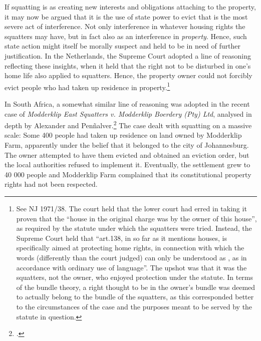 If squatting is  as creating new interests and obligations attaching to the property, it may now be argued that  it is the use of state power to evict that is the most severe act of interference. Not only interference in whatever housing rights the squatters may have, but in fact also as an interference in {\it property}. Hence, such state action might itself be morally suspect and held to be in need of further justification. In the Netherlands, the Supreme Court adopted a line of reasoning reflecting these insights, when it held that the right not to be disturbed in one's home life also applied to squatters. Hence, the property owner could not forcibly evict people who had taken up residence in  property.\footnote{See NJ 1971/38. The court held that the lower court had erred in taking it proven that the ``house in the original charge was  by the owner of this house'', as required by the statute under which the squatters were tried. Instead, the Supreme Court held that ``art.138, in so far as it mentions houses, is specifically aimed at protecting home rights, in connection with which the words  (differently than the court judged) can only be understood as  , as in accordance with ordinary use of language''. The upshot was that it was the squatters, not the owner, who enjoyed protection under the statute. In terms of the bundle theory, a right thought to be in the owner's bundle was deemed to actually belong to the bundle of the squatters, as this corresponded better to the circumstances of the case and the purposes meant to be served by the statute in question.}

In South Africa, a somewhat similar line of reasoning was adopted in the recent case of {\it Modderklip East Squatters v. Modderklip Boerdery (Pty) Ltd}, analysed in depth by Alexander and Pen\~{n}alver.\footcite[154-160]{alexander11} The case dealt with squatting on a massive scale: Some 400 people had taken up residence on land owned by Modderklip Farm, apparently under the belief that it belonged to the city of Johannesburg. The owner attempted to have them evicted and obtained an eviction order, but the local authorities refused to implement it. Eventually, the settlement grew to 40 000 people and Modderklip Farm complained that its constitutional property rights had not been respected.


